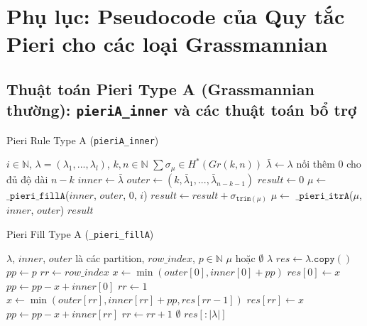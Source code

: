 \section*{Phụ lục: Pseudocode của Quy tắc Pieri cho các loại Grassmannian} \label{appendix:pseudocode}


\subsection*{Thuật toán Pieri Type A (Grassmannian thường): \texttt{pieriA\_inner} và các thuật toán bổ trợ}

\begin{algorithm}[H]
\caption{Pieri Rule Type A (\texttt{pieriA\_inner})}
\begin{algorithmic}[1]
\REQUIRE $i \in \mathbb{N}$, $\lambda = (\lambda_1, ..., \lambda_l)$, $k, n \in \mathbb{N}$
\ENSURE $\sum \sigma_\mu \in H^*(Gr(k,n))$
\STATE $\bar\lambda \gets \lambda$ nối thêm $0$ cho đủ độ dài $n-k$
\STATE $inner \gets \bar\lambda$
\STATE $outer \gets (k, \bar\lambda_1, ..., \bar\lambda_{n-k-1})$
\STATE $result \gets 0$
\STATE $\mu \gets$ $\mathtt{\_pieri\_fillA}$($inner$, $outer$, $0$, $i$)
\WHILE{$\mu \neq \emptyset$}
    \STATE $result \gets result + \sigma_{\mathtt{trim}(\mu)}$
    \STATE $\mu \gets$ $\mathtt{\_pieri\_itrA}$($\mu$, $inner$, $outer$)
\ENDWHILE
\RETURN $result$
\end{algorithmic}
\end{algorithm}

\begin{algorithm}[H]
\caption{Pieri Fill Type A (\texttt{\_pieri\_fillA})}
\begin{algorithmic}[1]
\REQUIRE $\lambda$, $inner$, $outer$ là các partition, $row\_index$, $p \in \mathbb{N}$
\ENSURE $\mu$ hoặc $\emptyset$
\IF{$\lambda = \emptyset$}
    \RETURN $\lambda$
\ENDIF
\STATE $res \gets \lambda.\mathtt{copy}()$
\STATE $pp \gets p$
\STATE $rr \gets row\_index$
    \STATE $x \gets \min(outer[0], inner[0] + pp)$
    \STATE $res[0] \gets x$
    \STATE $pp \gets pp - x + inner[0]$
    \STATE $rr \gets 1$
\ENDIF
{}
    \STATE $x \gets \min(outer[rr], inner[rr] + pp, res[rr-1])$
    \STATE $res[rr] \gets x$
    \STATE $pp \gets pp - x + inner[rr]$
    \STATE $rr \gets rr + 1$
\ENDWHILE
{}
    \RETURN $\emptyset$
\ENDIF
\RETURN $res[:|\lambda|]$
\end{algorithmic}
\end{algorithm}


